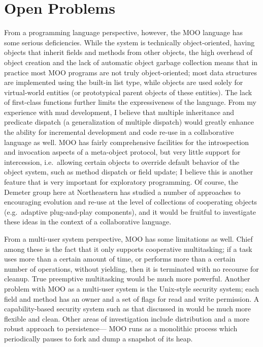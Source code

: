 \documentclass{article}
\begin{document}
\section{Open Problems}

From a programming language perspective, however, the MOO language has
some serious deficiencies.  While the system is technically
object-oriented, having objects that inherit fields and methods from
other objects, the high overhead of object creation and the lack of
automatic object garbage collection means that in practice most MOO
programs are not truly object-oriented; most data structures are
implemented using the built-in list type, while objects are used
solely for virtual-world entities (or prototypical parent objects of
these entities).  The lack of first-class functions further limits the
expressiveness of the language.  From my experience with mud
development, I believe that multiple inheritance and predicate
dispatch (a generalization of multiple
dispatch)\cite{predicate-dispatch} would greatly enhance the ability
for incremental development and code re-use in a collaborative
language as well.  MOO has fairly comprehensive facilities for the
introspection and invocation aspects of a meta-object
protocol\cite{MOP-tutorial}, but very little support for intercession,
i.e.\ allowing certain objects to override default behavior of the
object system, such as method dispatch or field update; I believe this
is another feature that is very important for exploratory programming.
Of course, the Demeter group here at Northeastern has studied a number
of approaches to encouraging evolution and re-use at the level of
collections of cooperating objects (e.g.\ adaptive plug-and-play
components\cite{APPC}), and it would be fruitful to investigate these
ideas in the context of a collaborative language.

From a multi-user system perspective, MOO has some limitations as
well.  Chief among these is the fact that it only supports cooperative
multitasking; if a task uses more than a certain amount of time, or
performs more than a certain number of operations, without yielding,
then it is terminated with no recourse for cleanup.  True preemptive
multitasking would be much more powerful.  Another problem with MOO as
a multi-user system is the Unix-style security system; each field and
method has an owner and a set of flags for read and write permission.
A capability-based security system such as that discussed
in\cite{security-kernel} would be much more flexible and clean.  Other
areas of investigation include distribution and a more robust approach
to persistence--- MOO runs as a monolithic process which periodically
pauses to fork and dump a snapshot of its heap.
\end{document}
